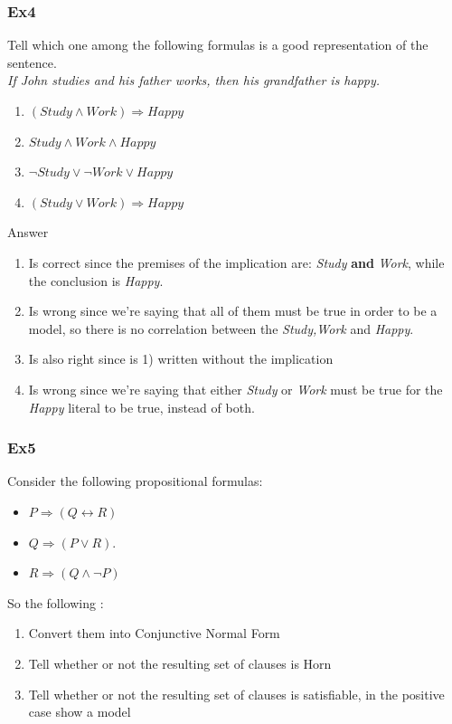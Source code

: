 \documentclass[10pt,a4paper]{article}
\begin{document}
\subsubsection{Ex4}
Tell which one among the following formulas is a good representation of the sentence.\\
\textit{If John studies and his father works, then his grandfather is happy.}\\
\begin{enumerate}
\item $(Study \wedge Work) \Rightarrow Happy$
\item $Study \wedge Work \wedge Happy$
\item $\neg Study \vee \neg Work \vee Happy$
\item $(Study \vee Work) \Rightarrow Happy$

\end{enumerate}

Answer
\begin{enumerate}
\item Is correct since the premises of the implication are: \textit{Study} \textbf{and} \textit{Work}, while the conclusion is \textit{Happy}.
\item Is wrong since we're saying that all of them must be true in order to be a model, so there is no correlation between the \textit{Study,Work} and \textit{Happy}.
\item Is also right since is 1) written without the implication
\item Is wrong since we're saying that either \textit{Study} or \textit{Work} must be true for the \textit{Happy} literal to be true, instead of both.
\end{enumerate}


\subsubsection{Ex5}
Consider the following propositional formulas:
\begin{itemize}
\item $P \Rightarrow (Q \leftrightarrow R)$
\item $Q \Rightarrow (P \vee R)$.
\item $R \Rightarrow (Q \wedge \neg P)$
\end{itemize}

So the following :
\begin{enumerate}
\item Convert them into Conjunctive Normal Form
\item Tell whether or not the resulting set of clauses is Horn
\item Tell whether or not the resulting set of clauses is satisfiable,
in the positive case show a model
\end{enumerate}
\end{document}
